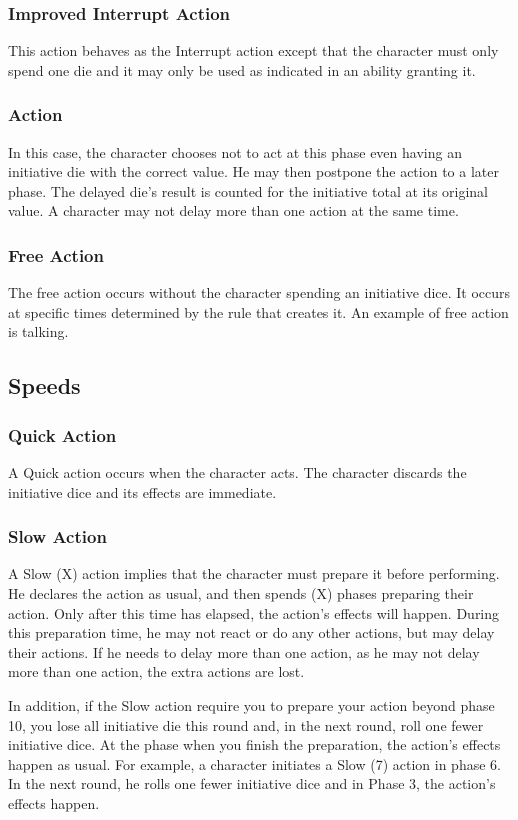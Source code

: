 \begin{multicols}{2}
\subsubsection{Improved Interrupt Action}
This action behaves as the Interrupt action except that the character must only spend one die and it may only be used as indicated in an ability granting it.

\subsubsection{Action}
In this case, the character chooses not to act at this phase even having an initiative die with the correct value. He may then postpone the action to a later phase. The delayed die’s result is counted for the initiative total at its original value. A character may not delay more than one action at the same time.

\subsubsection{Free Action}
The free action occurs without the character spending an initiative dice. It occurs at specific times determined by the rule that creates it. An example of free action is talking.

\subsection{Speeds}\label{subsec:speeds}
\subsubsection{Quick Action}
A Quick action occurs when the character acts. The character discards the initiative dice and its effects are immediate.

\subsubsection{Slow Action}
A Slow (X) action implies that the character must prepare it before performing. He declares the action as usual, and then spends (X) phases preparing their action. Only after this time has elapsed, the action’s effects will happen. During this preparation time, he may not react or do any other actions, but may delay their actions. If he needs to delay more than one action, as he may not delay more than one action, the extra actions are lost.

In addition, if the Slow action require you to prepare your action beyond phase 10, you lose all initiative die this round and, in the next round, roll one fewer initiative dice. At the phase when you finish the preparation, the action’s effects happen as usual. For example, a character initiates a Slow (7) action in phase 6. In the next round, he rolls one fewer initiative dice and in Phase 3, the action’s effects happen.


\end{multicols}

